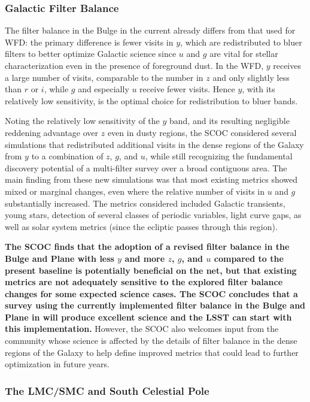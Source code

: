 \subsubsection{Galactic Filter Balance}\label{sec:subG:filterbalance}

The filter balance in the Bulge in the current  already differs from that used for WFD: the primary difference is fewer visits in $y$, which are redistributed to bluer filters to better optimize Galactic science since $u$ and $g$ are vital for stellar characterization even in the presence of foreground dust. In the WFD, $y$ receives a large number of visits, comparable to the number in $z$ and only slightly less than $r$ or $i$, while $g$ and especially $u$ receive fewer visits. Hence $y$, with its relatively low sensitivity, is the optimal choice for redistribution to bluer bands.

Noting the relatively low sensitivity of the $y$ band, and its resulting negligible reddening advantage over $z$ even in dusty regions, the SCOC considered several simulations that redistributed additional visits in the dense regions of the Galaxy from $y$ to a combination of $z$, $g$, and $u$, while still recognizing the fundamental discovery potential of a multi-filter survey over a broad contiguous area. The main finding from these new simulations was that most existing metrics showed mixed or marginal changes, even where the relative number of visits in $u$ and $g$ substantially increased. The metrics considered included Galactic transients, young stars, detection of several classes of periodic variables, light curve gaps, as well as solar system metrics (since the ecliptic passes through this region).

{\bf The SCOC finds that the adoption of a revised filter balance in the Bulge and Plane with less $y$ and more $z$, $g$, and $u$ compared to the present baseline is potentially beneficial on the net, but that existing metrics are not adequately sensitive to the explored filter balance changes for some expected science cases. The SCOC concludes that a survey using the currently implemented filter balance in the Bulge and Plane in  will produce excellent science and the LSST can start with this implementation.} 
However, the SCOC also welcomes input from the community whose science is affected by the details of filter balance in the dense regions of the Galaxy to help define improved metrics that could lead to further optimization in future years.


\subsubsection{The LMC/SMC and South Celestial Pole}\label{sec:subG:specialregions}

